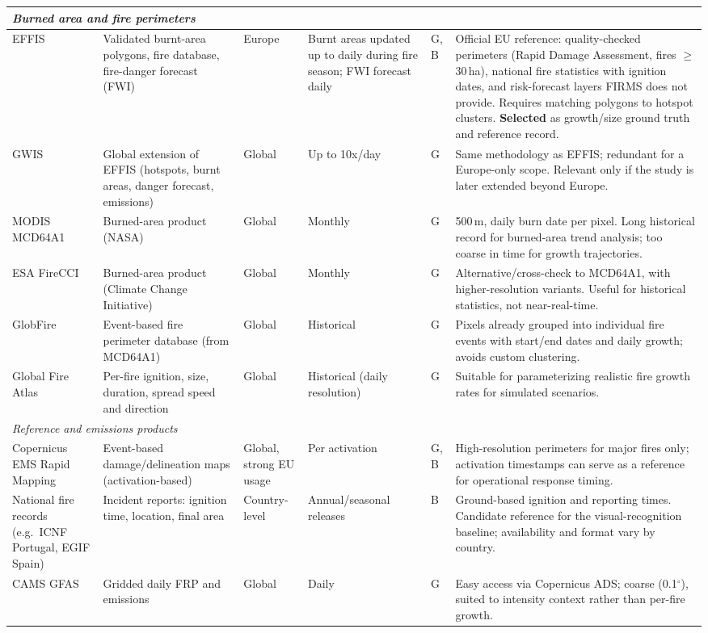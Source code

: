 \documentclass[11pt]{article}
\begin{document}
\begin{longtable}{p{2.3cm}p{2.5cm}p{1.8cm}p{1.8cm}p{0.9cm}p{4.1cm}}
\multicolumn{6}{l}{\textit{Burned area and fire perimeters}} \\
\midrule
EFFIS & Validated burnt-area polygons, fire database, fire-danger forecast (FWI) & Europe & Burnt areas updated up to daily during fire season; FWI forecast daily & G, B & Official EU reference: quality-checked perimeters (Rapid Damage Assessment, fires $\geq$30\,ha), national fire statistics with ignition dates, and risk-forecast layers FIRMS does not provide. Requires matching polygons to hotspot clusters. \textbf{Selected} as growth/size ground truth and reference record. \\
GWIS & Global extension of EFFIS (hotspots, burnt areas, danger forecast, emissions) & Global & Up to 10x/day & G & Same methodology as EFFIS; redundant for a Europe-only scope. Relevant only if the study is later extended beyond Europe. \\
MODIS MCD64A1 & Burned-area product (NASA) & Global & Monthly & G & 500\,m, daily burn date per pixel. Long historical record for burned-area trend analysis; too coarse in time for growth trajectories. \\
ESA FireCCI & Burned-area product (Climate Change Initiative) & Global & Monthly & G & Alternative/cross-check to MCD64A1, with higher-resolution variants. Useful for historical statistics, not near-real-time. \\
GlobFire & Event-based fire perimeter database (from MCD64A1) & Global & Historical & G & Pixels already grouped into individual fire events with start/end dates and daily growth; avoids custom clustering. \\
Global Fire Atlas & Per-fire ignition, size, duration, spread speed and direction & Global & Historical (daily resolution) & G & Suitable for parameterizing realistic fire growth rates for simulated scenarios. \\
\midrule

\multicolumn{6}{l}{\textit{Reference and emissions products}} \\
\midrule
Copernicus EMS Rapid Mapping & Event-based damage/\allowbreak delineation maps (activation-based) & Global, strong EU usage & Per activation & G, B & High-resolution perimeters for major fires only; activation timestamps can serve as a reference for operational response timing. \\
National fire records (e.g.\ ICNF Portugal, EGIF Spain) & Incident reports: ignition time, location, final area & Country-level & Annual/\allowbreak seasonal releases & B & Ground-based ignition and reporting times. Candidate reference for the visual-recognition baseline; availability and format vary by country. \\
CAMS GFAS & Gridded daily FRP and emissions & Global & Daily & G & Easy access via Copernicus ADS; coarse (0.1$^\circ$), suited to intensity context rather than per-fire growth. \\
\bottomrule
\end{longtable}
\end{document}

